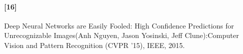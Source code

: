 \documentclass[12pt]{article}
\begin{document}
\paragraph{[16]}Deep Neural Networks are Easily Fooled:
High Confidence Predictions for Unrecognizable Images(Anh Nguyen, Jason Yosinski, Jeff Clune):Computer Vision and Pattern Recognition (CVPR ’15), IEEE, 2015.



\end{document}
